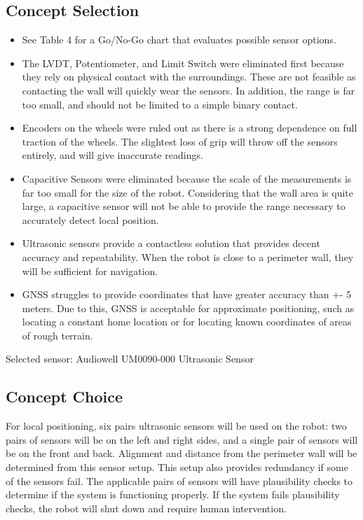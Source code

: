 \documentclass[12pt]{article}
\begin{document}
\subsection{Concept Selection}

\begin{itemize}
\setlength\itemsep{-0.5em}
\item See Table 4 for a Go/No-Go chart that evaluates possible sensor options.
\item The LVDT, Potentiometer, and Limit Switch were eliminated first because they rely on physical contact with the surroundings. These are not feasible as contacting the wall will quickly wear the sensors. In addition, the range is far too small, and should not be limited to a simple binary contact.

\item Encoders on the wheels were ruled out as there is a strong dependence on full traction of the wheels. The slightest loss of grip will throw off the sensors entirely, and will give inaccurate readings.

\item Capacitive Sensors were eliminated because the scale of the measurements is far too small for the size of the robot. Considering that the wall area is quite large, a capacitive sensor will not be able to provide the range necessary to accurately detect local position.

\item Ultrasonic sensors provide a contactless solution that provides decent accuracy and repeatability. When the robot is close to a perimeter wall, they will be sufficient for navigation.

\item GNSS struggles to provide coordinates that have greater accuracy than +- 5 meters. Due to this, GNSS is acceptable for approximate positioning, such as locating a constant home location or for locating known coordinates of areas of rough terrain. 
\end{itemize}

Selected sensor: Audiowell UM0090-000 Ultrasonic Sensor

\subsection{Concept Choice}
For local positioning, six pairs ultrasonic sensors will be used on the robot: two pairs of sensors will be on the left and right sides, and a single pair of sensors will be on the front and back. Alignment and distance from the perimeter wall will be determined from this sensor setup. This setup also provides redundancy if some of the sensors fail. The applicable pairs of sensors will have plausibility checks to determine if the system is functioning properly. If the system fails plausibility checks, the robot will shut down and require human intervention.
\end{document}
